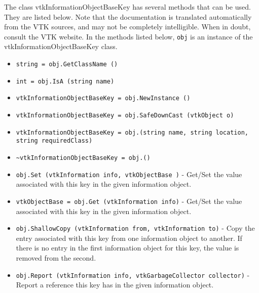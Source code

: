 The class vtkInformationObjectBaseKey has several methods that can be used.
  They are listed below.
Note that the documentation is translated automatically from the VTK sources,
and may not be completely intelligible.  When in doubt, consult the VTK website.
In the methods listed below, \verb|obj| is an instance of the vtkInformationObjectBaseKey class.
\begin{itemize}
\item  \verb|string = obj.GetClassName ()|

\item  \verb|int = obj.IsA (string name)|

\item  \verb|vtkInformationObjectBaseKey = obj.NewInstance ()|

\item  \verb|vtkInformationObjectBaseKey = obj.SafeDownCast (vtkObject o)|

\item  \verb|vtkInformationObjectBaseKey = obj.(string name, string location, string requiredClass)|

\item  \verb|~vtkInformationObjectBaseKey = obj.()|

\item  \verb|obj.Set (vtkInformation info, vtkObjectBase )| -  Get/Set the value associated with this key in the given
 information object.

\item  \verb|vtkObjectBase = obj.Get (vtkInformation info)| -  Get/Set the value associated with this key in the given
 information object.

\item  \verb|obj.ShallowCopy (vtkInformation from, vtkInformation to)| -  Copy the entry associated with this key from one information
 object to another.  If there is no entry in the first information
 object for this key, the value is removed from the second.

\item  \verb|obj.Report (vtkInformation info, vtkGarbageCollector collector)| -  Report a reference this key has in the given information object.

\end{itemize}
